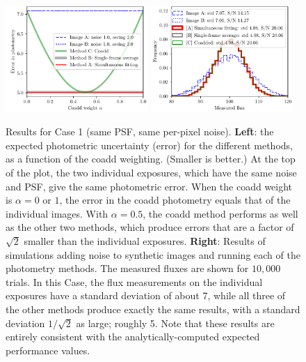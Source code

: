 \documentclass[a4paper,11pt]{article}
\begin{document}
\begin{figure}[b!]
  \begin{center}
    \includegraphics[width=0.48\textwidth]{coadd-00}
    \includegraphics[width=0.48\textwidth]{coadd-01}
  \end{center}
  \caption{Results for Case 1 (same PSF, same per-pixel noise).  \textbf{Left}: the expected photometric
    uncertainty (error) for the different methods, as a function of
    the coadd weighting.  (Smaller is better.)  At the top of the plot, the two individual
    exposures, which have the same noise and PSF, give the same
    photometric error.  When the coadd weight is $\alpha = 0$ or $1$,
    the error in the coadd photometry equals that of the individual
    images.  With $\alpha = 0.5$, the coadd method performs as well as
    the other two methods, which produce errors that are a factor of
    $\sqrt{2}$ smaller than the individual exposures.
    \newline \textbf{Right}: Results of simulations
    adding noise to synthetic images and running each of the
    photometry methods.  The measured fluxes are shown for $10,000$
    trials.  In this Case, the flux measurements on the individual
    exposures have a standard deviation of about 7, while all three
    of the other methods produce exactly the same results, with a standard
    deviation $1/\sqrt{2}$ as large; roughly 5.  Note that these results are
    entirely consistent with the analytically-computed expected performance values.
    \label{fig:caseone}}
\end{figure}
\end{document}
